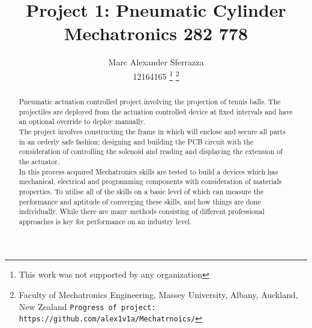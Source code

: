 \documentclass[a4paper, 10pt]{article}
\title{\LARGE \bf Project 1: Pneumatic Cylinder\\Mechatronics  282 778}
\author{Marc Alexander Sferrazza \\ 12164165
\thanks{This work was not supported by any organization}
\thanks{Faculty of Mechatronics Engineering, Massey University, Albany, Auckland, New Zealand
        {\tt\small Progress of project: https://github.com/alex1v1a/Mechatrnoics/} } }
\begin{document}
\maketitle


\thispagestyle{empty}
\pagestyle{plain}



\begin{abstract}

Pneumatic actuation controlled project involving the projection of tennis balls. The projectiles are deployed from the actuation controlled device at fixed intervals and have an optional override to deploy manually. 
\\

The project involves constructing the frame in which will enclose and secure all parts in an orderly safe fashion; designing and building the PCB circuit with the consideration of controlling the solenoid and reading and displaying the extension of the actuator.
\\

In this process acquired Mechatronics skills are tested to build a devices which has mechanical, electrical and programming components with consideration of materials properties. To utilise all of the skills on a basic level of which can measure the performance and aptitude of converging these skills, and how things are done individually. While there are many methods consisting of different professional approaches is key for performance on an industry level.



\end{abstract}


\clearpage
\tableofcontents
\listoffigures
\thispagestyle{empty}
\clearpage

\end{document}
